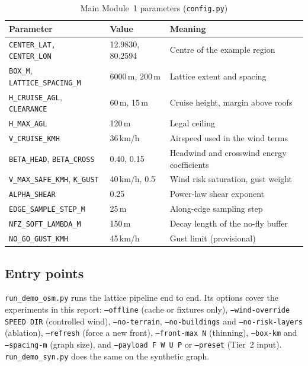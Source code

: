 \documentclass{ssnreview}
\begin{document}
\begin{table}[H]
\centering\caption{Main Module~1 parameters (\texttt{config.py})}\label{tab:params}\small
\begin{tabularx}{\textwidth}{L{4.4cm} L{2.4cm} Y}
\toprule
\textbf{Parameter} & \textbf{Value} & \textbf{Meaning}\\
\midrule
\texttt{CENTER\_LAT, CENTER\_LON} & 12.9830, 80.2594 & Centre of the example region\\
\texttt{BOX\_M}, \texttt{LATTICE\_SPACING\_M} & 6000\,m, 200\,m & Lattice extent and spacing\\
\texttt{H\_CRUISE\_AGL}, \texttt{CLEARANCE} & 60\,m, 15\,m & Cruise height, margin above roofs\\
\texttt{H\_MAX\_AGL} & 120\,m & Legal ceiling\\
\texttt{V\_CRUISE\_KMH} & 36\,km/h & Airspeed used in the wind terms\\
\texttt{BETA\_HEAD}, \texttt{BETA\_CROSS} & 0.40, 0.15 & Headwind and crosswind energy coefficients\\
\texttt{V\_MAX\_SAFE\_KMH}, \texttt{K\_GUST} & 40\,km/h, 0.5 & Wind risk saturation, gust weight\\
\texttt{ALPHA\_SHEAR} & 0.25 & Power-law shear exponent\\
\texttt{EDGE\_SAMPLE\_STEP\_M} & 25\,m & Along-edge sampling step\\
\texttt{NFZ\_SOFT\_LAMBDA\_M} & 150\,m & Decay length of the no-fly buffer\\
\texttt{NO\_GO\_GUST\_KMH} & 45\,km/h & Gust limit (provisional)\\
\bottomrule
\end{tabularx}
\end{table}

\subsection{Entry points}

\texttt{run\_demo\_osm.py} runs the lattice pipeline end to end. Its options cover the
experiments in this report: \texttt{--offline} (cache or fixtures only),
\texttt{--wind-override SPEED DIR} (controlled wind), \texttt{--no-terrain},
\texttt{--no-buildings} and \texttt{--no-risk-layers} (ablation), \texttt{--refresh}
(force a new front), \texttt{--front-max N} (thinning), \texttt{--box-km} and
\texttt{--spacing-m} (graph size), and \texttt{--payload F W U P} or \texttt{--preset}
(Tier~2 input). \texttt{run\_demo\_syn.py} does the same on the synthetic graph.
\end{document}
